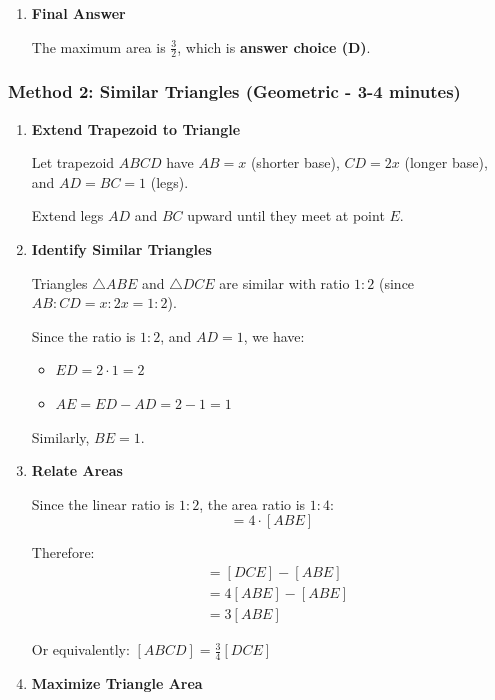 \documentclass[12pt]{article}
\begin{document}
\begin{solutionbox}
\begin{enumerate}[leftmargin=*]
    \item \textbf{Final Answer}
    
    The maximum area is $\frac{3}{2}$, which is \textbf{answer choice (D)}.
\end{enumerate}

\subsubsection*{Method 2: Similar Triangles (Geometric - 3-4 minutes)}

\begin{enumerate}[leftmargin=*]
    \item \textbf{Extend Trapezoid to Triangle}
    
    Let trapezoid $ABCD$ have $AB = x$ (shorter base), $CD = 2x$ (longer base), and $AD = BC = 1$ (legs).
    
    Extend legs $AD$ and $BC$ upward until they meet at point $E$.
    
    \item \textbf{Identify Similar Triangles}
    
    Triangles $\triangle ABE$ and $\triangle DCE$ are similar with ratio $1:2$ (since $AB:CD = x:2x = 1:2$).
    
    Since the ratio is $1:2$, and $AD = 1$, we have:
    \begin{itemize}
        \item $ED = 2 \cdot 1 = 2$
        \item $AE = ED - AD = 2 - 1 = 1$
    \end{itemize}
    
    Similarly, $BE = 1$.
    
    \item \textbf{Relate Areas}
    
    Since the linear ratio is $1:2$, the area ratio is $1:4$:
    \begin{equation}
        [DCE] = 4 \cdot [ABE]
    \end{equation}
    
    Therefore:
    \begin{align*}
        [ABCD] &= [DCE] - [ABE] \\
        &= 4[ABE] - [ABE] \\
        &= 3[ABE]
    \end{align*}
    
    Or equivalently: $[ABCD] = \frac{3}{4}[DCE]$
    
    \item \textbf{Maximize Triangle Area}
    

\end{enumerate}
\end{solutionbox}
\end{document}
